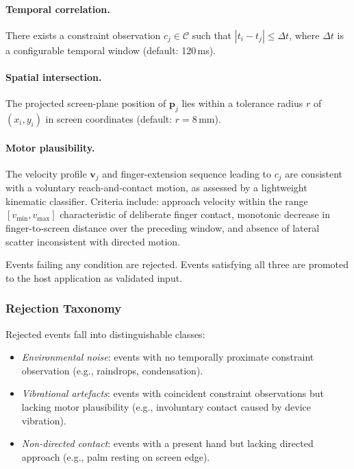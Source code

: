 \documentclass[11pt,letterpaper]{article}
\begin{document}
\paragraph{Temporal correlation.}
There exists a constraint observation $c_j \in \mathcal{C}$ such that
$|t_i - t_j| \leq \Delta t$, where $\Delta t$ is a configurable temporal window
(default: 120\,ms).

\paragraph{Spatial intersection.}
The projected screen-plane position of $\mathbf{p}_j$ lies within a tolerance
radius $r$ of $(x_i, y_i)$ in screen coordinates (default: $r = 8\,\mathrm{mm}$).

\paragraph{Motor plausibility.}
The velocity profile $\mathbf{v}_j$ and finger-extension sequence leading to $c_j$
are consistent with a voluntary reach-and-contact motion, as assessed by a
lightweight kinematic classifier. Criteria include: approach velocity within the
range $[v_{\min}, v_{\max}]$ characteristic of deliberate finger contact, monotonic
decrease in finger-to-screen distance over the preceding window, and absence of
lateral scatter inconsistent with directed motion.

Events failing any condition are rejected. Events satisfying all three are promoted
to the host application as validated input.

\subsubsection{Rejection Taxonomy}

Rejected events fall into distinguishable classes:

\begin{itemize}[leftmargin=2em]
  \item \emph{Environmental noise}: events with no temporally proximate constraint
        observation (e.g., raindrops, condensation).
  \item \emph{Vibrational artefacts}: events with coincident constraint observations
        but lacking motor plausibility (e.g., involuntary contact caused by device
        vibration).
  \item \emph{Non-directed contact}: events with a present hand but lacking directed
        approach (e.g., palm resting on screen edge).
\end{itemize}
\end{document}
